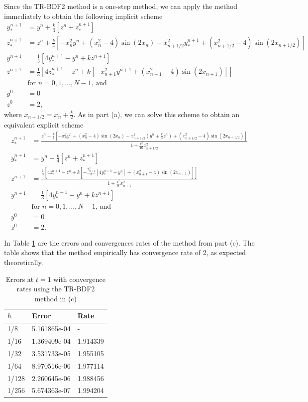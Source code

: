 \documentclass{homework}
\begin{document}
\begin{alphaparts}
		\questionpart Since the TR-BDF2 method is a one-step method, we can apply the method immediately to obtain the following implicit scheme
		\begin{align*}
			y_*^{n+1} &= y^n + \frac{k}{4}\left[z^n + z_*^{n+1}\right] \\
			z_*^{n+1} &= z^n + \frac{k}{4}\left[-x_n^2y^n + (x_n^2 - 4)\sin(2x_n) - x_{n+1/2}^2y_*^{n+1} + (x_{n+1/2}^2-4)\sin(2x_{n+1/2})\right] \\
			y^{n+1} &= \frac{1}{3}\left[4y_*^{n+1} - y^n + kz^{n+1}\right] \\
			z^{n+1} &= \frac{1}{3}\left[4z_*^{n+1} - z^n + k\left[-x_{n+1}^2y^{n+1} + (x_{n+1}^2 - 4)\sin(2x_{n+1})\right]\right] \\
			&\text{for $n = 0, 1, \dots, N-1$, and} \\
			y^0 &= 0 \\
			z^0 &= 2,
		\end{align*}
		where $x_{n+1/2} = x_n + \frac{k}{2}$. As in part (a), we can solve this scheme to obtain an equivalent explicit scheme
		\begin{align*}
			z_*^{n+1} &= \frac{z^n + \frac{k}{4}\left[-x_n^2y^n + (x_n^2-4)\sin(2x_n) -x_{n+1/2}^2\left(y^n + \frac{k}{4}z^n\right) + (x_{n+1/2}^2-4)\sin(2x_{n+1/2})\right]}{1 + \frac{k^2}{16}x_{n+1/2}^2} \\
			y_*^{n+1} &= y^n + \frac{k}{4}\left[z^n + z_*^{n+1}\right] \\
			z^{n+1} &= \frac{\frac{1}{3}\left[4z_*^{n+1} - z^n + k\left[-\frac{x_{n+1}^2}{3}\left[4y_*^{n+1} - y^n\right] + (x_{n+1}^2 -4)\sin(2x_{n+1})\right]\right]}{1+\frac{k^2}{9}x_{n+1}^2} \\
			y^{n+1} &= \frac{1}{3}\left[4y_*^{n+1} - y^n + kz^{n+1}\right]\\
			&\text{for $n = 0,1,\dots,N-1$, and} \\
			y^0 &= 0 \\
			z^0 &= 2.
		\end{align*}
		
		\questionpart In Table \ref{tab:p1d} are the errors and convergences rates of the method from part (c). The table shows that the method empirically has convergence rate of 2, as expected theoretically.
		
		\begin{table}[h]
			\centering
			\begin{tabular}{@{}lll@{}}
				\toprule
				$h$ & Error & Rate \\
				\midrule
				1/8 & 5.161865e-04 & -\\
				1/16 & 1.369409e-04 & 1.914339\\
				1/32 & 3.531733e-05 & 1.955105\\
				1/64 & 8.970516e-06 & 1.977114\\
				1/128 & 2.260645e-06 & 1.988456\\
				1/256 & 5.674363e-07 & 1.994204\\
				\bottomrule
			\end{tabular}
			\caption{Errors at $t=1$ with convergence rates using the TR-BDF2 method in (c)}
			\label{tab:p1d}
		\end{table}

	\end{alphaparts}
	
\end{document}
